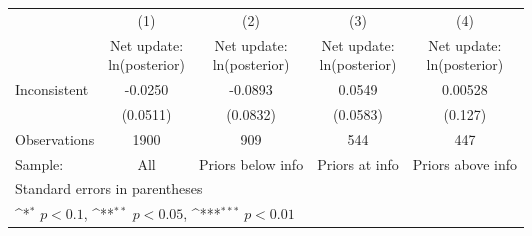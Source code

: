 {
\def\sym#1{\ifmmode^{#1}\else\(^{#1}\)\fi}
\begin{tabular}{l*{4}{c}}
\hline\hline
                    &\multicolumn{1}{c}{(1)}         &\multicolumn{1}{c}{(2)}         &\multicolumn{1}{c}{(3)}         &\multicolumn{1}{c}{(4)}         \\
                    &\shortstack{Net update: \\ ln(posterior)}         &\shortstack{Net update: \\ ln(posterior)}         &\shortstack{Net update: \\ ln(posterior)}         &\shortstack{Net update: \\ ln(posterior)}         \\
\hline
Inconsistent        &     -0.0250         &     -0.0893         &      0.0549         &     0.00528         \\
                    &    (0.0511)         &    (0.0832)         &    (0.0583)         &     (0.127)         \\
\hline
Observations        &        1900         &         909         &         544         &         447         \\
Sample:             &         All         &Priors below info         &Priors at info         &Priors above info         \\
\hline\hline
\multicolumn{5}{l}{\footnotesize Standard errors in parentheses}\\
\multicolumn{5}{l}{\footnotesize \sym{*} \(p<0.1\), \sym{**} \(p<0.05\), \sym{***} \(p<0.01\)}\\
\end{tabular}
}
